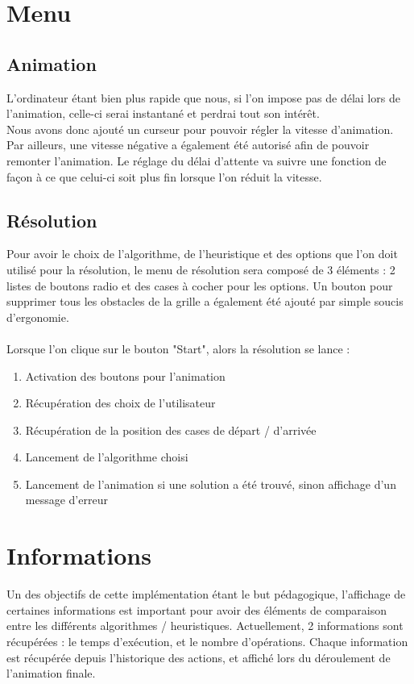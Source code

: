 \documentclass{report}
\begin{document}
	\section{Menu}
		\subsection{Animation}
		L'ordinateur étant bien plus rapide que nous, si l'on impose pas de délai lors de l'animation, celle-ci serai instantané et perdrai tout son intérêt.\\
		Nous avons donc ajouté un curseur pour pouvoir régler la vitesse d'animation. Par ailleurs, une vitesse négative a également été autorisé afin de pouvoir remonter l'animation.
		Le réglage du délai d'attente va suivre une fonction de façon à ce que celui-ci soit plus fin lorsque l'on réduit la vitesse.
		
		\subsection{Résolution}
		Pour avoir le choix de l'algorithme, de l'heuristique et des options que l'on doit utilisé pour la résolution, le menu de résolution sera composé de 3 éléments : 2 listes de boutons radio et des cases à cocher pour les options.
		Un bouton pour supprimer tous les obstacles de la grille a également été ajouté par simple soucis d'ergonomie.\\\\
		Lorsque l'on clique sur le bouton "Start", alors la résolution se lance :
			\begin{enumerate}
				\item Activation des boutons pour l'animation
				\item Récupération des choix de l'utilisateur
				\item Récupération de la position des cases de départ / d'arrivée
				\item Lancement de l'algorithme choisi
				\item Lancement de l'animation si une solution a été trouvé, sinon affichage d'un message d'erreur
			\end{enumerate}
	
	\section{Informations}
	Un des objectifs de cette implémentation étant le but pédagogique, l'affichage de certaines informations est important pour avoir des éléments de comparaison entre les différents algorithmes / heuristiques.
	Actuellement, 2 informations sont récupérées : le temps d'exécution, et le nombre d'opérations.
	Chaque information est récupérée depuis l'historique des actions, et affiché lors du déroulement de l'animation finale.
	
\end{document}
